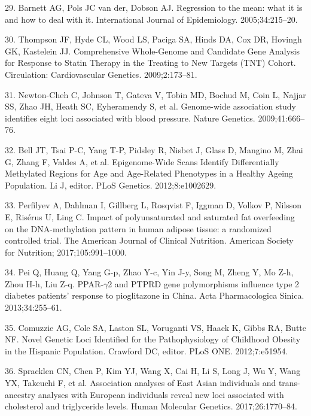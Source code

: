 \documentclass[]{article}
\begin{document}
\leavevmode\hypertarget{ref-Barnett2005}{}%
29. Barnett AG, Pols JC van der, Dobson AJ. Regression to the mean: what
it is and how to deal with it. International Journal of Epidemiology.
2005;34:215--20.

\leavevmode\hypertarget{ref-Thompson2009}{}%
30. Thompson JF, Hyde CL, Wood LS, Paciga SA, Hinds DA, Cox DR, Hovingh
GK, Kastelein JJ. Comprehensive Whole-Genome and Candidate Gene Analysis
for Response to Statin Therapy in the Treating to New Targets (TNT)
Cohort. Circulation: Cardiovascular Genetics. 2009;2:173--81.

\leavevmode\hypertarget{ref-Newton-Cheh2009}{}%
31. Newton-Cheh C, Johnson T, Gateva V, Tobin MD, Bochud M, Coin L,
Najjar SS, Zhao JH, Heath SC, Eyheramendy S, et al. Genome-wide
association study identifies eight loci associated with blood pressure.
Nature Genetics. 2009;41:666--76.

\leavevmode\hypertarget{ref-Bell2012}{}%
32. Bell JT, Tsai P-C, Yang T-P, Pidsley R, Nisbet J, Glass D, Mangino
M, Zhai G, Zhang F, Valdes A, et al. Epigenome-Wide Scans Identify
Differentially Methylated Regions for Age and Age-Related Phenotypes in
a Healthy Ageing Population. Li J, editor. PLoS Genetics.
2012;8:e1002629.

\leavevmode\hypertarget{ref-Perfilyev2017}{}%
33. Perfilyev A, Dahlman I, Gillberg L, Rosqvist F, Iggman D, Volkov P,
Nilsson E, Risérus U, Ling C. Impact of polyunsaturated and saturated
fat overfeeding on the DNA-methylation pattern in human adipose tissue:
a randomized controlled trial. The American Journal of Clinical
Nutrition. American Society for Nutrition; 2017;105:991--1000.

\leavevmode\hypertarget{ref-Pei2013}{}%
34. Pei Q, Huang Q, Yang G-p, Zhao Y-c, Yin J-y, Song M, Zheng Y, Mo
Z-h, Zhou H-h, Liu Z-q. PPAR-\(\gamma\)2 and PTPRD gene polymorphisms
influence type 2 diabetes patients' response to pioglitazone in China.
Acta Pharmacologica Sinica. 2013;34:255--61.

\leavevmode\hypertarget{ref-Comuzzie2012}{}%
35. Comuzzie AG, Cole SA, Laston SL, Voruganti VS, Haack K, Gibbs RA,
Butte NF. Novel Genetic Loci Identified for the Pathophysiology of
Childhood Obesity in the Hispanic Population. Crawford DC, editor. PLoS
ONE. 2012;7:e51954.

\leavevmode\hypertarget{ref-Spracklen2017}{}%
36. Spracklen CN, Chen P, Kim YJ, Wang X, Cai H, Li S, Long J, Wu Y,
Wang YX, Takeuchi F, et al. Association analyses of East Asian
individuals and trans-ancestry analyses with European individuals reveal
new loci associated with cholesterol and triglyceride levels. Human
Molecular Genetics. 2017;26:1770--84.
\end{document}
